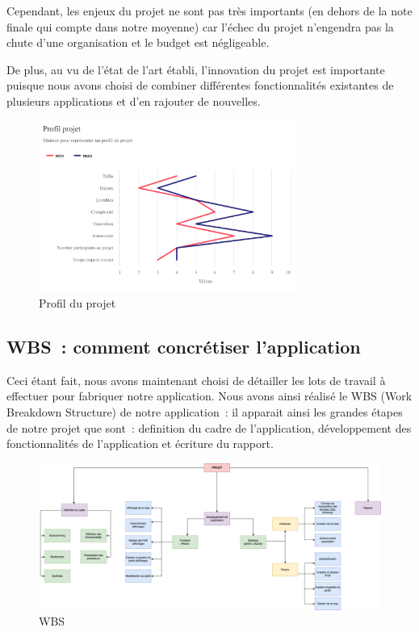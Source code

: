 \documentclass[french,a4paper]{article}
\begin{document}
Cependant, les enjeux du projet ne sont pas très importants (en dehors de la note finale qui compte dans notre moyenne) car l'échec du projet n'engendra pas la chute d'une organisation et le budget est négligeable.

De plus, au vu de l’état de l’art établi, l’innovation du projet est importante puisque nous avons choisi de combiner différentes fonctionnalités existantes de plusieurs applications et d’en rajouter de nouvelles.

\begin{figure}[H]
    \centering
    \includegraphics[width=0.75\textwidth]{img/profil_projet.png}
    \caption{Profil du projet}
\end{figure}

\subsection{WBS~: comment concrétiser l’application}
Ceci étant fait, nous avons maintenant choisi de détailler les lots de travail à effectuer pour fabriquer notre application. Nous avons ainsi réalisé le WBS (Work Breakdown Structure) de notre application~: il apparait ainsi les grandes étapes de notre projet que sont~: definition du cadre de l’application, développement des fonctionnalités de l’application et écriture du rapport.
\begin{figure}[H]
    \centering
    \includegraphics[width=1\textwidth]{img/WBS.png}
    \caption{WBS}
\end{figure}
\end{document}
